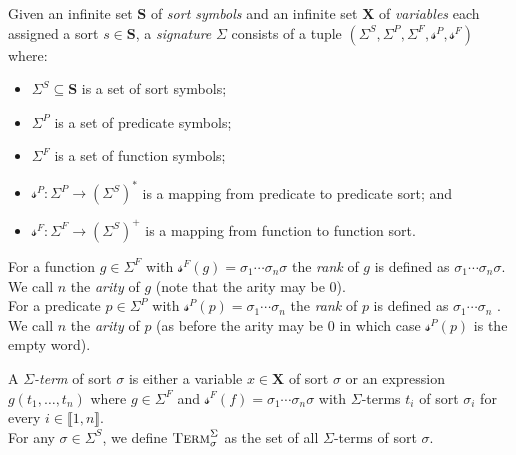 \begin{definition}[Signature]
Given an infinite set $\mathbf{S}$ of \textit{sort symbols} and an infinite set $\mathbf{X}$ of \textit{variables} each assigned a sort $s\in\mathbf{S}$, a \textit{signature} $\Sigma$ consists of a tuple $\left(\Sigma^S, \Sigma^P, \Sigma^F, \mathcal{s}^P, \mathcal{s}^F \right)$ where:
\begin{itemize}
    \item $\Sigma^S \subseteq \mathbf{S}$ is a set of sort symbols;
    \item $\Sigma^P$ is a set of predicate symbols;
    \item $\Sigma^F$ is a set of function symbols;
    \item $\mathcal{s}^P\colon \Sigma^P \to \left(\Sigma^S\right)^\ast$ is a mapping from predicate to predicate sort; and
    \item $\mathcal{s}^F\colon \Sigma^F \to \left(\Sigma^S\right)^+$ is a mapping from function to function sort.
\end{itemize}
\end{definition}

\begin{definition}
For a function $g\in\Sigma^F$ with $\mathcal{s}^F(g)=\sigma_1\dotsi\sigma_n\sigma$ the \textit{rank} of $g$ is defined as $\sigma_1\dotsi\sigma_n\sigma$. We call $n$ the \textit{arity} of $g$ (note that the arity may be $0$).\\
For a predicate $p\in\Sigma^P$ with $\mathcal{s}^P(p)=\sigma_1\dotsi\sigma_n$ the \textit{rank} of $p$ is defined as $\sigma_1\dotsi\sigma_n$ . We call $n$ the \textit{arity} of $p$ (as before the arity may be $0$ in which case $\mathcal{s}^P(p)$ is the empty word).
\end{definition}

\begin{definition}
A \textit{$\Sigma$-term} of sort $\sigma$ is either a variable $x\in\mathbf{X}$ of sort $\sigma$ or an expression $g\left(t_1,\dots,t_n\right)$ where $g\in\Sigma^F$ and $\mathcal{s}^F(f)=\sigma_1\dotsi\sigma_n\sigma$ with $\Sigma$-terms $t_i$ of sort $\sigma_i$ for every $i\in\llbracket1,n\rrbracket$.\\
For any $\sigma\in\Sigma^S$, we define $\textsc{Term}^\Sigma_\sigma$ as the set of all $\Sigma$-terms of sort $\sigma$.
\end{definition}

